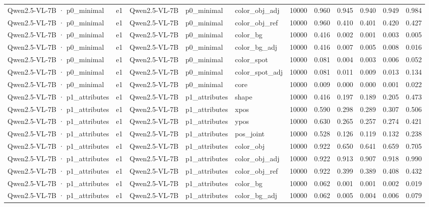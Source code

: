 \begin{tabular}{lllllrrrrrr}
Qwen2.5-VL-7B · p0\_minimal & e1 & Qwen2.5-VL-7B & p0\_minimal & color\_obj\_adj & 10000 & 0.960 & 0.945 & 0.940 & 0.949 & 0.984 \\
Qwen2.5-VL-7B · p0\_minimal & e1 & Qwen2.5-VL-7B & p0\_minimal & color\_obj\_ref & 10000 & 0.960 & 0.410 & 0.401 & 0.420 & 0.427 \\
Qwen2.5-VL-7B · p0\_minimal & e1 & Qwen2.5-VL-7B & p0\_minimal & color\_bg & 10000 & 0.416 & 0.002 & 0.001 & 0.003 & 0.005 \\
Qwen2.5-VL-7B · p0\_minimal & e1 & Qwen2.5-VL-7B & p0\_minimal & color\_bg\_adj & 10000 & 0.416 & 0.007 & 0.005 & 0.008 & 0.016 \\
Qwen2.5-VL-7B · p0\_minimal & e1 & Qwen2.5-VL-7B & p0\_minimal & color\_spot & 10000 & 0.081 & 0.004 & 0.003 & 0.006 & 0.052 \\
Qwen2.5-VL-7B · p0\_minimal & e1 & Qwen2.5-VL-7B & p0\_minimal & color\_spot\_adj & 10000 & 0.081 & 0.011 & 0.009 & 0.013 & 0.134 \\
Qwen2.5-VL-7B · p0\_minimal & e1 & Qwen2.5-VL-7B & p0\_minimal & core & 10000 & 0.009 & 0.000 & 0.000 & 0.001 & 0.022 \\
Qwen2.5-VL-7B · p1\_attributes & e1 & Qwen2.5-VL-7B & p1\_attributes & shape & 10000 & 0.416 & 0.197 & 0.189 & 0.205 & 0.473 \\
Qwen2.5-VL-7B · p1\_attributes & e1 & Qwen2.5-VL-7B & p1\_attributes & xpos & 10000 & 0.590 & 0.298 & 0.289 & 0.307 & 0.506 \\
Qwen2.5-VL-7B · p1\_attributes & e1 & Qwen2.5-VL-7B & p1\_attributes & ypos & 10000 & 0.630 & 0.265 & 0.257 & 0.274 & 0.421 \\
Qwen2.5-VL-7B · p1\_attributes & e1 & Qwen2.5-VL-7B & p1\_attributes & pos\_joint & 10000 & 0.528 & 0.126 & 0.119 & 0.132 & 0.238 \\
Qwen2.5-VL-7B · p1\_attributes & e1 & Qwen2.5-VL-7B & p1\_attributes & color\_obj & 10000 & 0.922 & 0.650 & 0.641 & 0.659 & 0.705 \\
Qwen2.5-VL-7B · p1\_attributes & e1 & Qwen2.5-VL-7B & p1\_attributes & color\_obj\_adj & 10000 & 0.922 & 0.913 & 0.907 & 0.918 & 0.990 \\
Qwen2.5-VL-7B · p1\_attributes & e1 & Qwen2.5-VL-7B & p1\_attributes & color\_obj\_ref & 10000 & 0.922 & 0.399 & 0.389 & 0.408 & 0.432 \\
Qwen2.5-VL-7B · p1\_attributes & e1 & Qwen2.5-VL-7B & p1\_attributes & color\_bg & 10000 & 0.062 & 0.001 & 0.001 & 0.002 & 0.019 \\
Qwen2.5-VL-7B · p1\_attributes & e1 & Qwen2.5-VL-7B & p1\_attributes & color\_bg\_adj & 10000 & 0.062 & 0.005 & 0.004 & 0.006 & 0.079 \\

\end{tabular}
